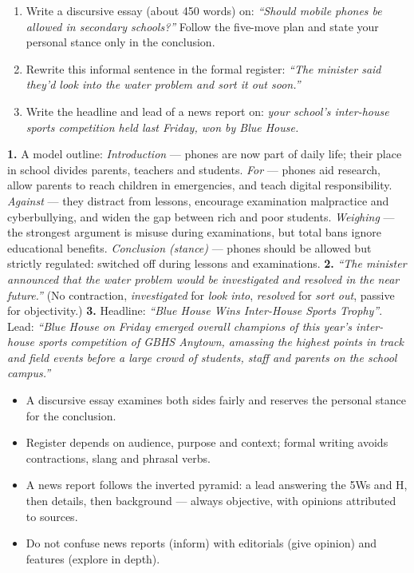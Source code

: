 \documentclass[11pt]{article}
\newcommand{\cle}[1]{{\popxbold\color{popdark}#1}}
\begin{document}
\begin{exercice}
\begin{enumerate}
\item Write a discursive essay (about 450 words) on: \emph{``Should mobile phones be allowed in secondary schools?''} Follow the five-move plan and state your personal stance only in the conclusion.
\item Rewrite this informal sentence in the formal register: \emph{``The minister said they'd look into the water problem and sort it out soon.''}
\item Write the headline and lead of a news report on: \emph{your school's inter-house sports competition held last Friday, won by Blue House.}
\end{enumerate}
\end{exercice}

\begin{corrige}[Exercise 1]
\textbf{1.} A model outline: \emph{Introduction} — phones are now part of daily life; their place in school divides parents, teachers and students. \emph{For} — phones aid research, allow parents to reach children in emergencies, and teach digital responsibility. \emph{Against} — they distract from lessons, encourage examination malpractice and cyberbullying, and widen the gap between rich and poor students. \emph{Weighing} — the strongest argument is misuse during examinations, but total bans ignore educational benefits. \emph{Conclusion (stance)} — phones should be allowed but strictly regulated: switched off during lessons and examinations.
\textbf{2.} \emph{``The minister announced that the water problem would be investigated and resolved in the near future.''} (No contraction, \emph{investigated} for \emph{look into}, \emph{resolved} for \emph{sort out}, passive for objectivity.)
\textbf{3.} Headline: \emph{``Blue House Wins Inter-House Sports Trophy''}. Lead: \emph{``Blue House on Friday emerged overall champions of this year's inter-house sports competition of GBHS Anytown, amassing the highest points in track and field events before a large crowd of students, staff and parents on the school campus.''}
\end{corrige}

\begin{aretenir}
\begin{itemize}
\item A \cle{discursive essay} examines both sides fairly and reserves the personal stance for the conclusion.
\item \cle{Register} depends on audience, purpose and context; formal writing avoids contractions, slang and phrasal verbs.
\item A \cle{news report} follows the inverted pyramid: a lead answering the 5Ws and H, then details, then background — always objective, with opinions attributed to sources.
\item Do not confuse news reports (inform) with editorials (give opinion) and features (explore in depth).
\end{itemize}
\end{aretenir}
\end{document}
